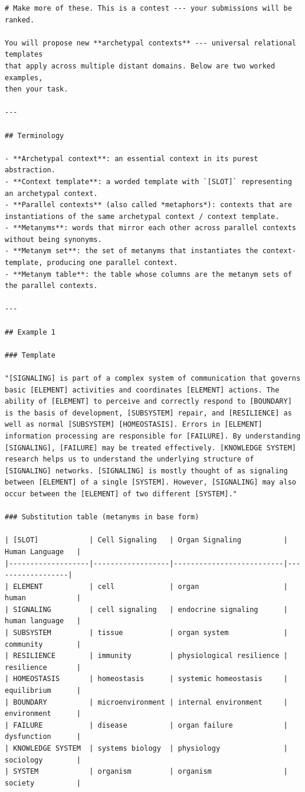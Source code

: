 \documentclass{article}
\begin{document}
\begin{lstlisting}
# Make more of these. This is a contest --- your submissions will be ranked.

You will propose new **archetypal contexts** --- universal relational templates
that apply across multiple distant domains. Below are two worked examples,
then your task.

---

## Terminology

- **Archetypal context**: an essential context in its purest abstraction.
- **Context template**: a worded template with `[SLOT]` representing an archetypal context.
- **Parallel contexts** (also called *metaphors*): contexts that are instantiations of the same archetypal context / context template.
- **Metanyms**: words that mirror each other across parallel contexts without being synonyms.
- **Metanym set**: the set of metanyms that instantiates the context-template, producing one parallel context.
- **Metanym table**: the table whose columns are the metanym sets of the parallel contexts.

---

## Example 1

### Template

"[SIGNALING] is part of a complex system of communication that governs basic [ELEMENT] activities and coordinates [ELEMENT] actions. The ability of [ELEMENT] to perceive and correctly respond to [BOUNDARY] is the basis of development, [SUBSYSTEM] repair, and [RESILIENCE] as well as normal [SUBSYSTEM] [HOMEOSTASIS]. Errors in [ELEMENT] information processing are responsible for [FAILURE]. By understanding [SIGNALING], [FAILURE] may be treated effectively. [KNOWLEDGE SYSTEM] research helps us to understand the underlying structure of [SIGNALING] networks. [SIGNALING] is mostly thought of as signaling between [ELEMENT] of a single [SYSTEM]. However, [SIGNALING] may also occur between the [ELEMENT] of two different [SYSTEM]."

### Substitution table (metanyms in base form)

| [SLOT]            | Cell Signaling   | Organ Signaling          | Human Language   |
|-------------------|------------------|--------------------------|------------------|
| ELEMENT           | cell             | organ                    | human            |
| SIGNALING         | cell signaling   | endocrine signaling      | human language   |
| SUBSYSTEM         | tissue           | organ system             | community        |
| RESILIENCE        | immunity         | physiological resilience | resilience       |
| HOMEOSTASIS       | homeostasis      | systemic homeostasis     | equilibrium      |
| BOUNDARY          | microenvironment | internal environment     | environment      |
| FAILURE           | disease          | organ failure            | dysfunction      |
| KNOWLEDGE SYSTEM  | systems biology  | physiology               | sociology        |
| SYSTEM            | organism         | organism                 | society          |


\end{lstlisting}
\end{document}

